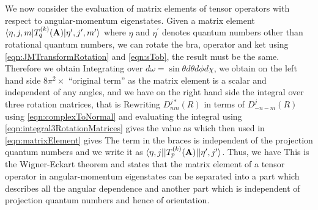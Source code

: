  We now consider the evaluation of  matrix elements of tensor operators with respect to angular-momentum eigenstates. 
Given a matrix element $\langle \eta, j, m | T_q^{(k)}(\mathbf{A})  | \eta^{\prime}, j^{\prime}, m^{\prime} \rangle$ where
$\eta$ and $\eta^{\prime}$ denotes quantum numbers other than rotational quantum numbers, we can rotate the bra, 
operator and ket using \autoref{eqn:JMTransformRotation} and \autoref{eqn:sTob}, the result must be the same. 
Therefore we obtain
Integrating over $d\omega = \sin\theta d\theta d\phi  d\chi$, we obtain on the left hand side $8\pi^2 \times$ ``original 
term'' as the matrix element is a scalar and independent of any angles, and we have on the right hand side the integral over three rotation matrices, that is
Rewriting $D^{j *}_{n m}(R)$ in terms of $D^j_{-n -m}(R)$ using \autoref{eqn:complexToNormal} and evaluating the integral 
using \autoref{eqn:integral3RotationMatrices} gives the value as
which then used in \autoref{eqn:matrixElement} gives
The term in the braces is independent of the projection quantum numbers and we write it as $\langle \eta, j | |T_p^{(k)}(\mathbf{A})|  | \eta^{\prime}, j^{\prime} \rangle$. Thus, we have\cite{RotSpect}
This is the Wigner-Eckart theorem and states that the matrix element of a tensor operator in angular-momentum
eigenstates can be separated into a part which describes all the angular dependence  and another part which is 
independent of projection quantum numbers and hence of orientation. 

